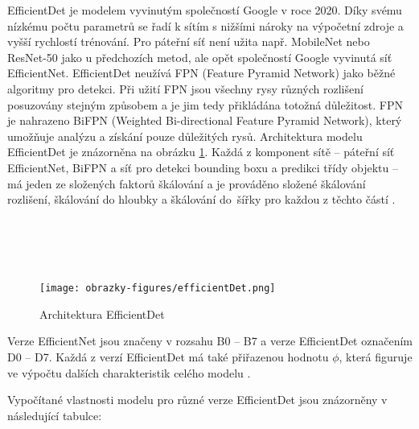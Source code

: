 EfficientDet je modelem vyvinutým společností Google v roce 2020. Díky svému nízkému počtu parametrů se řadí k sítím s nižšími nároky na výpočetní zdroje a vyšší rychlostí trénování. Pro páteřní síť není užita např. MobileNet nebo ResNet-50 jako u předchozích metod, ale opět společností Google vyvinutá síť EfficientNet. EfficientDet neužívá FPN (Feature Pyramid Network) jako běžné algoritmy pro detekci. Při užití FPN jsou všechny rysy různých rozlišení posuzovány stejným způsobem a je jim tedy přikládána totožná důležitost. FPN je nahrazeno BiFPN (Weighted Bi-directional Feature Pyramid Network), který umožňuje analýzu a získání pouze důležitých rysů.  Architektura modelu EfficientDet je znázorněna na obrázku \ref{fig:efficientdet}. Každá z komponent sítě -- páteřní síť EfficientNet, BiFPN a síť pro detekci bounding boxu a predikci třídy objektu -- má jeden ze složených faktorů škálování a je prováděno složené škálování rozlišení, škálování do hloubky a škálování do~šířky pro každou z těchto částí \cite{EfficientDet, EfficientDetBlog}.\\\\\\\\\\

\begin{figure}[!htbp]
    \centering
    \texttt{[image: obrazky-figures/efficientDet.png]}
    \caption{Architektura EfficientDet \cite{EfficientDet}}
    \label{fig:efficientdet}
\end{figure} 

Verze EfficientNet jsou značeny v rozsahu B0 -- B7 a verze EfficientDet označením D0 -- D7. Každá z verzí EfficientDet má také přiřazenou hodnotu $\phi$, která figuruje ve výpočtu dalších charakteristik celého modelu \cite{EfficientDet, EfficientDetBlog}. 

\iffalse
Vypočítané vlastnosti modelu pro různé verze EfficientDet jsou znázorněny v následující tabulce:


